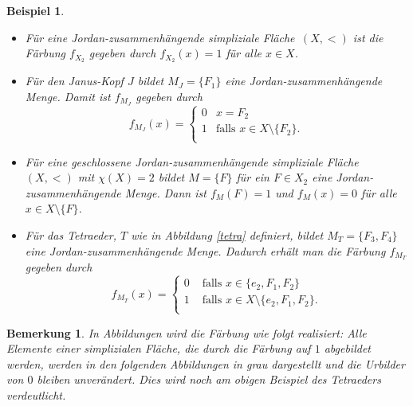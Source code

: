 \documentclass[12pt,titlepage,twoside,cleardoublepage]{article}
\theoremstyle{nummermitklammern}
\newtheorem{bsp}[temp]{Beispiel}
\newtheorem{bemerkung}[temp]{Bemerkung}
\newtheorem{bsp}[zahl]{Beispiel}
\newtheorem{bemerkung}[zahl]{Bemerkung}
\numberwithin{equation}{section}
\begin{document}
\begin{bsp}
\begin{itemize}
\item Für eine Jordan-zusammenhängende simpliziale Fläche   $\,(X,<)$ ist die Färbung $f_{X_2}$ gegeben durch $f_{X_2}(x)=1$ für alle $x \in X$.

\item Für den Janus-Kopf $J$ bildet $M_J=\{F_1\}$ eine Jordan-zusammenhängende Menge. Damit ist $f_{M_J}$ gegeben durch
\[
f_{M_J}(x)=\begin{cases}
0 &x=F_2\\
1 & \text{falls } x\in X\setminus \{F_2\}.\\
		\end{cases}
\]
\item Für eine geschlossene Jordan-zusammenhängende simpliziale Fläche $(X,<)$ mit $\chi(X)=2$ bildet $M=\{F\}$ für ein $F \in X_2$ eine Jordan-zusammenhängende Menge. Dann ist $f_M(F)=1$ und $f_M(x)=0$ für alle $x \in X\setminus \{F\}$.
\item Für das Tetraeder, $T$ wie in Abbildung \ref{tetra} definiert, bildet $M_T=\{F_3,F_4\}$ eine Jordan-zusammenhängende Menge. Dadurch erhält man die Färbung $f_{M_T}$ gegeben durch
\[
f_{M_T}(x)=\begin{cases}
		0 & \text{ falls } x  \in \{e_2,F_1,F_2\}\\
1 &\text{ falls }x \in X\setminus \{e_2,F_1,F_2\}.\\
		\end{cases}
\]

\end{itemize}
\end{bsp}
\begin{bemerkung}
In Abbildungen wird die Färbung wie folgt realisiert:
Alle Elemente einer simplizialen Fläche, die durch die Färbung auf $1$ abgebildet werden, werden in den folgenden Abbildungen in grau dargestellt und die Urbilder von $0$ bleiben unverändert. Dies wird noch am obigen Beispiel des Tetraeders verdeutlicht.
\end{bemerkung}
\end{document}
